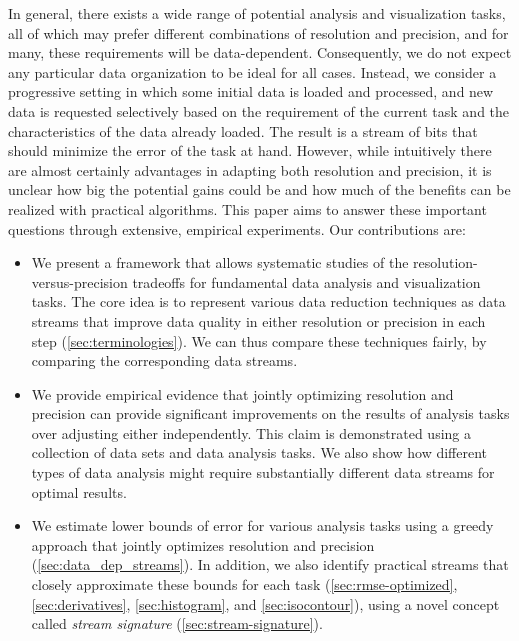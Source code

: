 In general, there exists a wide range of potential analysis and visualization tasks, all of which may
prefer different combinations of resolution and precision, and for many, these requirements will be
data-dependent. Consequently, we do not expect any particular data organization to be ideal for all
cases. Instead, we consider a progressive setting in which some initial data is loaded and processed,
and new data is requested selectively based on the requirement of the current task and the
characteristics of the data already loaded. The result is a stream of bits that should minimize
the error of the task at hand. However, while intuitively there are almost certainly advantages in
adapting both resolution and precision, it is unclear how big the potential gains could be
and how
much of the benefits can be realized with practical algorithms. This paper aims to answer these
important questions through extensive, empirical experiments. Our contributions are:

\begin{itemize}
\item We present a framework that allows systematic studies of the resolution-versus-precision
  tradeoffs for fundamental data analysis and visualization tasks. The core idea is to represent
  various data reduction techniques as data streams that improve data quality in either resolution
  or precision in each step (\autoref{sec:terminologies}).
We can thus compare these techniques
  fairly, by comparing the corresponding data streams.
   
\item We provide empirical evidence that jointly optimizing resolution and precision can provide
  significant improvements on the results of analysis tasks over adjusting either independently.
  This claim is demonstrated using a collection of data sets and data analysis tasks. We also show
  how different types of data analysis might require substantially different data streams for
  optimal results.

\item We estimate lower bounds of error
for various analysis tasks using a greedy approach that
  jointly optimizes resolution and precision (\autoref{sec:data_dep_streams}).
In addition, we also
  identify practical streams that closely approximate these bounds for each task
  (\autoref{sec:rmse-optimized}, \autoref{sec:derivatives}, \autoref{sec:histogram}, and
  \autoref{sec:isocontour}), using a novel concept called \emph{stream signature}
  (\autoref{sec:stream-signature}).
\end{itemize}

